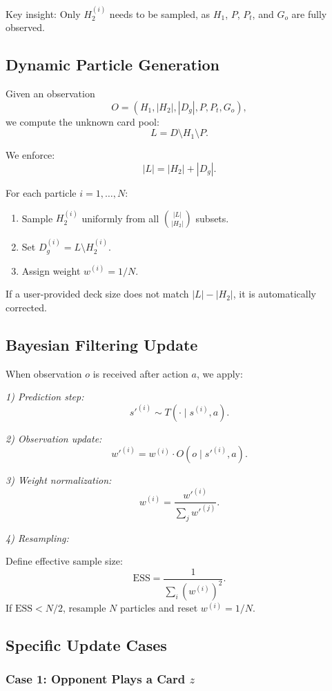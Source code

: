\documentclass[journal,transmag]{IEEEtran}
\begin{document}
Key insight: Only $H_2^{(i)}$ needs to be sampled, as $H_1$, $P$, $P_t$, and
$G_o$ are fully observed.

\subsection{Dynamic Particle Generation}

Given an observation
\[
O = (H_1, |H_2|, |D_g|, P, P_t, G_o),
\]
we compute the unknown card pool:
\[
L = D \setminus H_1 \setminus P.
\]

We enforce:
\[
|L| = |H_2| + |D_g|.
\]

For each particle $i = 1,\ldots,N$:
\begin{enumerate}
    \item Sample $H_2^{(i)}$ uniformly from all $\binom{|L|}{|H_2|}$ subsets.
    \item Set $D_g^{(i)} = L \setminus H_2^{(i)}$.
    \item Assign weight $w^{(i)} = 1/N$.
\end{enumerate}

If a user-provided deck size does not match $|L|-|H_2|$, it is automatically corrected.

\subsection{Bayesian Filtering Update}

When observation $o$ is received after action $a$, we apply:

\textit{1) Prediction step:}
\[
s'^{(i)} \sim T(\cdot \mid s^{(i)}, a).
\]

\textit{2) Observation update:}
\[
w'^{(i)} = w^{(i)} \cdot O(o \mid s'^{(i)}, a).
\]

\textit{3) Weight normalization:}
\[
w^{(i)} = \frac{w'^{(i)}}{\sum_j w'^{(j)}}.
\]

\textit{4) Resampling:  }

Define effective sample size:
\[
\text{ESS} = \frac{1}{\sum_i (w^{(i)})^2}.
\]
If $\text{ESS} < N/2$, resample $N$ particles and reset
$w^{(i)} = 1/N$.

\subsection{Specific Update Cases}

\subsubsection{Case 1: Opponent Plays a Card $z$}
\end{document}
